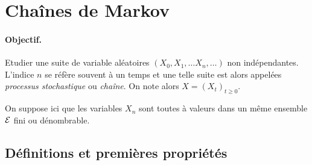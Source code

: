 \section{Chaînes de Markov}  \label{sec:Proba-Markov}

\newcommand{\cM}{{chaîne de Markov}\xspace}
\newcommand{\CM}{{Chaîne de Markov}\xspace}
\newcommand{\per}{\text{per}}

% 


\paragraph*{Objectif.}
Etudier une suite de variable aléatoires $(X_0, X_1, \dots X_n, \dots)$ non indépendantes. L'indice $n$ se réfère souvent à un temps et une telle suite est alors appelées {\em processus stochastique} ou {\em chaîne}. On note alors $X = (X_t)_{t \geq 0}$.

On suppose ici que les variables $X_n$ sont toutes à valeurs dans un même ensemble $\mathcal{E}$ fini ou dénombrable.

\subsection{Définitions et premières propriétés}  

